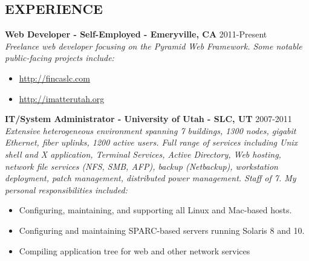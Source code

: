 \documentclass[line,margin]{res}
\begin{document}
\date{\today}
\address{\href{mailto:parker@parkerpinette.com}{parker@parkerpinette.com} \\ (801) 638-8611 \\ \url{https://github.com/ppinette}}

\begin{resume}


\section{EXPERIENCE}
 {\bf Web Developer - Self-Employed - Emeryville, CA} \hfill 2011-Present\\
 {\sl Freelance web developer focusing on the Pyramid Web Framework. Some notable public-facing projects include:}
  \begin{itemize} \itemsep -2pt %
  \item \url{http://fincaslc.com}  %
  \item \url{http://imatterutah.org}
  \end{itemize}
 {\bf IT/System Administrator - University of Utah - SLC, UT} \hfill 2007-2011\\
 {\sl Extensive heterogeneous environment spanning 7 buildings, 1300 nodes, gigabit Ethernet, fiber uplinks, 1200 active users. Full range of services including Unix shell and X application, Terminal Services, Active Directory, Web hosting, network file services (NFS, SMB, AFP), backup (Netbackup), workstation deployment, patch management, distributed power management. Staff of 7. My personal responsibilities included:}
   \begin{itemize} \itemsep -2pt
   \item Configuring, maintaining, and supporting all Linux and Mac-based hosts.
   \item Configuring and maintaining SPARC-based servers running Solaris 8 and 10.
   \item Compiling application tree for web and other network services

\end{itemize}
\end{resume}
\end{document}
